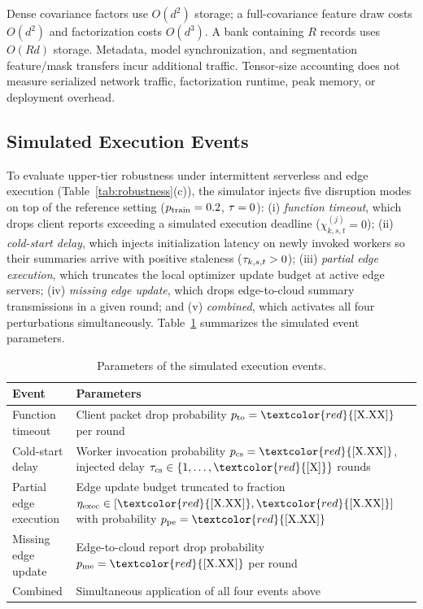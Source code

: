 Dense covariance factors use $O(d^2)$ storage; a full-covariance feature draw costs $O(d^2)$ and factorization costs $O(d^3)$. A bank containing $R$ records uses $O(Rd)$ storage. Metadata, model synchronization, and segmentation feature/mask transfers incur additional traffic. Tensor-size accounting does not measure serialized network traffic, factorization runtime, peak memory, or deployment overhead.

\subsection{Simulated Execution Events}

To evaluate upper-tier robustness under intermittent serverless and edge execution (Table~\ref{tab:robustness}(c)), the simulator injects five disruption modes on top of the reference setting ($p_{\mathrm{train}}=0.2$, $\tau=0$): (i) \emph{function timeout}, which drops client reports exceeding a simulated execution deadline ($\chi_{k,s,t}^{(j)}=0$); (ii) \emph{cold-start delay}, which injects initialization latency on newly invoked workers so their summaries arrive with positive staleness ($\tau_{k,s,t}>0$); (iii) \emph{partial edge execution}, which truncates the local optimizer update budget at active edge servers; (iv) \emph{missing edge update}, which drops edge-to-cloud summary transmissions in a given round; and (v) \emph{combined}, which activates all four perturbations simultaneously. Table~\ref{tab:event_params} summarizes the simulated event parameters.

\begin{table}[t]
\centering
\footnotesize
\caption{Parameters of the simulated execution events.}
\label{tab:event_params}
\setlength{\tabcolsep}{4pt}
\begin{tabular}{@{}p{}p{}@{}}
\toprule
Event & Parameters \\
\midrule
Function timeout & Client packet drop probability $p_{\mathrm{to}}=\textcolor{red}{[\text{X.XX}]}$ per round \\
Cold-start delay & Worker invocation probability $p_{\mathrm{cs}}=\textcolor{red}{[\text{X.XX}]}$, injected delay $\stale_{\mathrm{cs}}\in\{1,\ldots,\textcolor{red}{[\text{X}]}\}$ rounds \\
Partial edge execution & Edge update budget truncated to fraction $\eta_{\mathrm{exec}}\in[\textcolor{red}{[\text{X.XX}]},\textcolor{red}{[\text{X.XX}]}]$ with probability $p_{\mathrm{pe}}=\textcolor{red}{[\text{X.XX}]}$ \\
Missing edge update & Edge-to-cloud report drop probability $p_{\mathrm{me}}=\textcolor{red}{[\text{X.XX}]}$ per round \\
Combined & Simultaneous application of all four events above \\
\bottomrule
\end{tabular}
\end{table}

